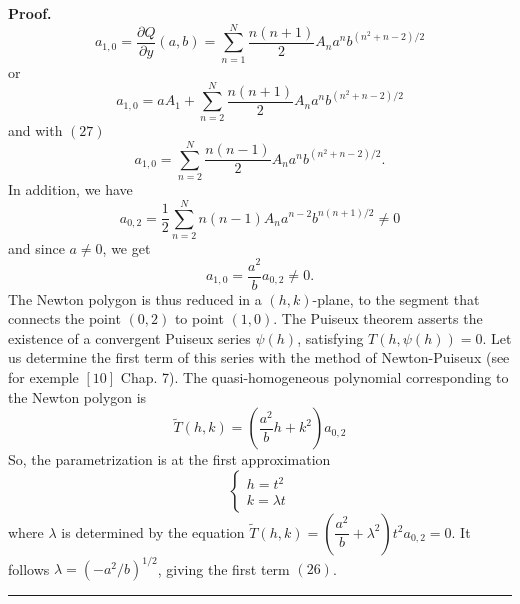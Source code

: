 \documentclass{article}
\newenvironment{proof}[1][Proof]{\textbf{#1.} }{\ \rule{0.5em}{0.5em}}
\begin{document}
\begin{proof}
\begin{equation*}
a_{1,0}=\dfrac{\partial Q}{\partial y}\left( a,b\right) =\sum_{n=1}^{N}\dfrac{n\left( n+1\right) }{2}A_{n}a^{n}b^{\left( n^{2}+n-2\right) /2}
\end{equation*}
or 
\begin{equation*}
a_{1,0}=aA_{1}+\sum_{n=2}^{N}\dfrac{n\left( n+1\right) }{2}A_{n}a^{n}b^{\left( n^{2}+n-2\right) /2}
\end{equation*}
and with $\left( 27\right) $\begin{equation*}
a_{1,0}=\sum_{n=2}^{N}\dfrac{n\left( n-1\right) }{2}A_{n}a^{n}b^{\left(
n^{2}+n-2\right) /2}\text{.}
\end{equation*}
In addition, we have 
\begin{equation*}
a_{0,2}=\dfrac{1}{2}\sum_{n=2}^{N}n\left( n-1\right) A_{n}a^{n-2}b^{n\left(
n+1\right) /2}\neq 0
\end{equation*}
and since $a\neq 0$, we get 
\begin{equation*}
a_{1,0}=\dfrac{a^{2}}{b}a_{0,2}\neq 0\text{.}
\end{equation*}
The Newton polygon is thus reduced in a $\left( h,k\right) $-plane, to the
segment that connects the point $\left( 0,2\right) $ to point $\left(
1,0\right) $. The Puiseux theorem asserts the existence of a convergent
Puiseux series $\psi \left( h\right) $, satisfying $T\left( h,\psi \left(
h\right) \right) =0$. Let us determine the first term of this series with
the method of Newton-Puiseux (see for exemple $\left[ 10\right] $ Chap. 7).
The quasi-homogeneous polynomial corresponding to the Newton polygon is 
\begin{equation*}
\widetilde{T}\left( h,k\right) =\left( \dfrac{a^{2}}{b}h+k^{2}\right) a_{0,2}
\end{equation*}
So, the parametrization is at the first approximation 
\begin{equation*}
\left\{ 
\begin{array}{c}
h=t^{2} \\ 
k=\lambda t
\end{array}
\right. 
\end{equation*}
where $\lambda $ is determined by the equation $\widetilde{T}\left(
h,k\right) =\left( \dfrac{a^{2}}{b}+\lambda ^{2}\right) t^{2}a_{0,2}=0$. It
follows $\lambda =\left( -a^{2}/b\right) ^{1/2}$, giving the first term $\left( 26\right) $.
\end{proof}

\bigskip
\end{document}
